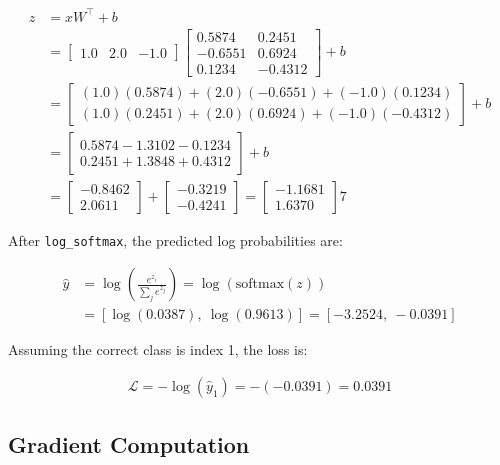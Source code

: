 \begin{align}
	z &= xW^\top + b \\
	&= \begin{bmatrix} 1.0 & 2.0 & -1.0 \end{bmatrix}
	\begin{bmatrix}
		0.5874 & 0.2451 \\
		-0.6551 & 0.6924 \\
		0.1234 & -0.4312
	\end{bmatrix}
	+ b \\
	&= \begin{bmatrix}
		(1.0)(0.5874) + (2.0)(-0.6551) + (-1.0)(0.1234) \\
		(1.0)(0.2451) + (2.0)(0.6924) + (-1.0)(-0.4312)
	\end{bmatrix}
	+ b \\
	&= \begin{bmatrix}
		0.5874 - 1.3102 - 0.1234 \\
		0.2451 + 1.3848 + 0.4312
	\end{bmatrix}
	+ b \\
	&= \begin{bmatrix}
		-0.8462 \\
		2.0611
	\end{bmatrix}
	+
	\begin{bmatrix}
		-0.3219 \\
		-0.4241
	\end{bmatrix}
	=
	\begin{bmatrix}
		-1.1681 \\
		1.6370
	\end{bmatrix}
7\end{align}

After \texttt{log\_softmax}, the predicted log probabilities are:

\begin{align}
	\hat{y} &= \log \left( \frac{e^{z_i}}{\sum_j e^{z_j}} \right)
	= \log \left( \text{softmax}(z) \right) \\
	&= \left[ \log(0.0387),\ \log(0.9613) \right]
	= \left[ -3.2524,\ -0.0391 \right]
\end{align}

Assuming the correct class is index 1, the loss is:

\begin{align}
	\mathcal{L} = -\log(\hat{y}_1) = -(-0.0391) = 0.0391
\end{align}

\subsection*{Gradient Computation}


